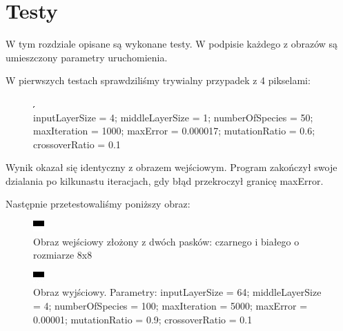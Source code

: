 \documentclass[12pt,a4paper,oneside]{article}
\begin{document}
\section{Testy}
W tym rozdziale opisane są wykonane testy. W podpisie każdego z obrazów są umieszczony parametry uruchomienia.

W pierwszych testach sprawdziliśmy trywialny przypadek z 4 pikselami:
\begin{figure}[h]
\centering
\includegraphics[width=.3\textwidth]{4x4}
\caption{inputLayerSize = 4; middleLayerSize = 1; numberOfSpecies = 50; maxIteration = 1000; maxError = 0.000017; mutationRatio = 0.6; crossoverRatio = 0.1}
\end{figure}
Wynik okazał się identyczny z obrazem wejściowym. Program zakończył swoje dzialania po kilkunastu iteracjach, gdy błąd przekroczył granicę maxError.

Następnie przetestowaliśmy poniższy obraz:

\begin{figure}[h]
\centering
\includegraphics[width=.3\textwidth]{gray2s}
\caption{Obraz wejściowy złożony z dwóch pasków: czarnego i białego o rozmiarze 8x8}
\end{figure}

\begin{figure}[H]
\centering
\includegraphics[width=.3\textwidth]{gray2s-o}
\caption{Obraz wyjściowy. Parametry: inputLayerSize = 64; middleLayerSize = 4; numberOfSpecies = 100; maxIteration = 5000; maxError = 0.00001; mutationRatio = 0.9; crossoverRatio = 0.1}
\end{figure}
\end{document}
